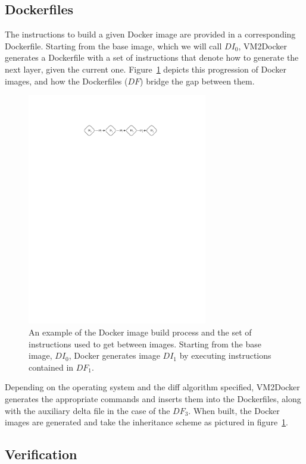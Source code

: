 \subsection{Dockerfiles}
The instructions to build a given Docker image are provided in a corresponding Dockerfile. Starting from the base image, which we will call $DI_0$, VM2Docker generates a Dockerfile with a set of instructions that denote how to generate the next layer, given the current one. Figure~\ref{fig:dockerfiles} depicts this progression of Docker images, and how the Dockerfiles ($DF$) bridge the gap between them.

\begin{figure}[h]
\label{fig:dockerfiles}
\centering
    \includegraphics[width=0.7\textwidth]{dockerfiles.pdf}
    \caption{An example of the Docker image build process and the set of instructions used to get between images. Starting from the base image, $DI_0$, Docker generates image $DI_1$ by executing instructions contained in $DF_1$.}
\end{figure}

Depending on the operating system and the diff algorithm specified, VM2Docker generates the appropriate commands and inserts them into the Dockerfiles, along with the auxiliary delta file in the case of the $DF_3$. When built, the Docker images are generated and take the inheritance scheme as pictured in figure~\ref{fig:dockerfiles}.


\subsection{Verification}

